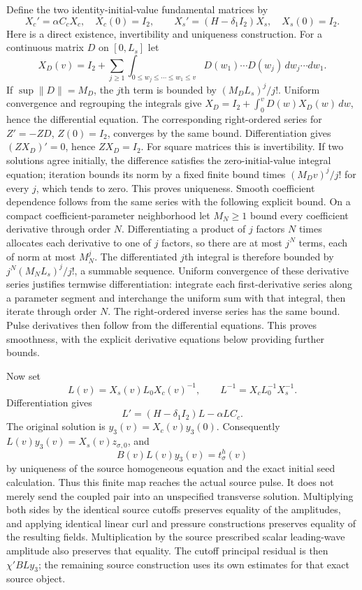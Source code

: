 \documentclass[11pt]{article}
\begin{document}
Define the two identity-initial-value fundamental matrices by
\[
 X_c'=\alpha C_cX_c,\quad X_c(0)=I_2,\qquad
 X_s'=(H-\delta_1I_2)X_s,\quad X_s(0)=I_2.
\]
Here is a direct existence, invertibility and uniqueness construction.
For a continuous matrix $D$ on $[0,L_s]$ let
\[
 X_D(v)=I_2+
 \sum_{j\ge1}\int_{0\le w_j\le\cdots\le w_1\le v}
       D(w_1)\cdots D(w_j)\,dw_j\cdots dw_1 .
\]
If $\sup\|D\|=M_D$, the $j$th term is bounded by
$(M_DL_s)^j/j!$. Uniform convergence and regrouping the integrals
give $X_D=I_2+\int_0^vD(w)X_D(w)\,dw$, hence the differential
equation. The corresponding right-ordered series for
$Z'=-ZD$, $Z(0)=I_2$, converges by the same bound.
Differentiation gives $(ZX_D)'=0$, hence $ZX_D=I_2$.
For square matrices this is invertibility. If two solutions agree
initially, the difference satisfies the zero-initial-value integral
equation; iteration bounds its norm by a fixed finite bound times
$(M_Dv)^j/j!$ for every $j$, which tends to zero.
This proves uniqueness. Smooth coefficient dependence follows from
the same series with the following explicit bound. On a compact
coefficient-parameter neighborhood let $M_N\ge1$ bound every coefficient
derivative through order $N$. Differentiating a product of $j$ factors
$N$ times allocates each derivative to one of $j$ factors, so there are
at most $j^N$ terms, each of norm at most $M_N^j$. The differentiated
$j$th integral is therefore bounded by
$j^N(M_NL_s)^j/j!$, a summable sequence. Uniform convergence of these
derivative series justifies termwise differentiation: integrate each
first-derivative series along a parameter segment and interchange the
uniform sum with that integral, then iterate through order $N$.
The right-ordered inverse series has the same bound. Pulse derivatives
then follow from the differential equations. This proves smoothness,
with the explicit derivative equations below providing further bounds.

Now set
\begin{equation}\label{tgframe:intertwiner}
 L(v)=X_s(v)L_0X_c(v)^{-1},\qquad
 L^{-1}=X_cL_0^{-1}X_s^{-1}.
\end{equation}
Differentiation gives
\[
 L'=(H-\delta_1I_2)L-\alpha LC_c.
\]
The original solution is $y_3(v)=X_c(v)y_3(0)$.
Consequently $L(v)y_3(v)=X_s(v)z_{\sigma,0}$, and
\begin{equation}\label{tgframe:exactpulsematch}
 B(v)L(v)y_3(v)=t^h_\sigma(v)
\end{equation}
by uniqueness of the source homogeneous equation and the exact initial
seed calculation. Thus this finite map reaches the actual source pulse.
It does not merely send the coupled pair into an unspecified transverse
solution. Multiplying both sides by the identical source cutoffs
preserves equality of the amplitudes, and applying identical linear
curl and pressure constructions preserves equality of the resulting
fields. Multiplication by the source prescribed scalar leading-wave
amplitude also preserves that equality. The cutoff principal residual
is then $\chi'BLy_3$; the remaining source construction uses its own
estimates for that exact source object.
\end{document}

